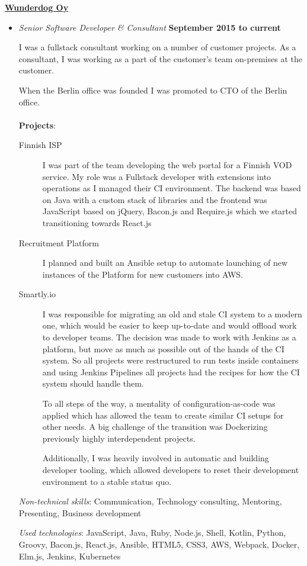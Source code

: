 \documentclass[10pt,english,a4paper]{article}
\newenvironment{outerlist}[1][\enskip\textbullet]%
        {\begin{itemize}[#1]}{\end{itemize}%
         \vspace{-.6\baselineskip}}
\newcommand{\blankline}{\quad\pagebreak[2]}
\begin{document}
\href{http://www.wunderdog.fi/}{\textbf{Wunderdog Oy}}
\begin{outerlist}

  \item[] \textit{Senior Software Developer \& Consultant}
  \hfill \textbf{September 2015 to current }
  \par
  I was a fullstack consultant working on a number of customer projects. As a consultant, I was working as a part of the customer's team on-premises at the customer.

  When the Berlin office was founded I was promoted to CTO of the Berlin office.
  \\
  \\
  \textbf{Projects}:
  \begin{description}
    \item [Finnish ISP] I was part of the team developing the web portal for a Finnish VOD service.
    My role was a Fullstack developer with extensions into operations as I managed their CI environment.
    The backend was based on Java with a custom stack of libraries and the frontend was JavaScript based on jQuery, Bacon.js and Require.js which we started transitioning towards React.js

    \item [Recruitment Platform] I planned and built an Ansible setup to automate launching of new instances of the Platform for new customers into AWS.

    \item [Smartly.io] I was responsible for migrating an old and stale CI system to a modern one, which would be easier to keep up-to-date and would offload work to developer teams.
    The decision was made to work with Jenkins as a platform, but move as much as possible out of the hands of the CI system.
    So all projects were restructured to run tests inside containers and using Jenkins Pipelines all projects had the recipes for how the CI system should handle them.\par
    To all steps of the way, a mentality of configuration-as-code was applied which has allowed the team to create similar CI setups for other needs.
    A big challenge of the transition was Dockerizing previously highly interdependent projects.
    \par
    Additionally, I was heavily involved in automatic and building developer tooling, which allowed developers to reset their development environment to a stable status quo.
  \end{description}

  \emph{Non-technical skills}: Communication, Technology consulting, Mentoring, Presenting, Business development
  \par
  \emph{Used technologies}: JavaScript, Java, Ruby, Node.js, Shell, Kotlin, Python, Groovy, Bacon.js, React.js, Ansible, HTML5, CSS3, AWS, Webpack, Docker, Elm.js, Jenkins, Kubernetes\\
\end{outerlist}
\blankline
\end{document}
